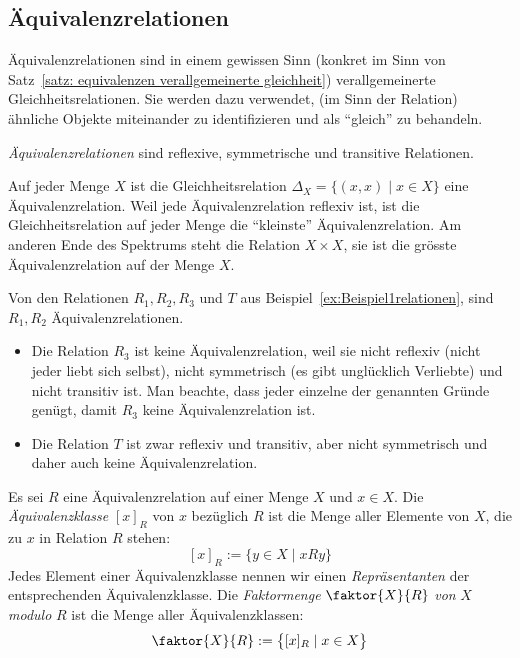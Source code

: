     \subsection*{Äquivalenzrelationen}

    Äquivalenzrelationen sind in einem gewissen Sinn (konkret im Sinn von Satz~\ref{satz: equivalenzen verallgemeinerte gleichheit}) verallgemeinerte Gleichheitsrelationen. Sie werden dazu verwendet, (im Sinn der Relation) ähnliche Objekte miteinander zu identifizieren und als ``gleich'' zu behandeln.

    \begin{df}
    \textit{Äquivalenzrelationen} sind reflexive, symmetrische und transitive Relationen.
    \end{df}

    \begin{bsp}
    Auf jeder Menge $X$ ist die Gleichheitsrelation $\Delta_X=\{(x,x)\mid x\in X \}$ eine Äquivalenzrelation. Weil jede Äquivalenzrelation reflexiv ist, ist die Gleichheitsrelation auf jeder Menge die ``kleinste'' Äquivalenzrelation. Am anderen Ende des Spektrums steht die Relation $X\times X$, sie ist die grösste Äquivalenzrelation auf der Menge $X$.
    \end{bsp}

    \begin{bsp}
    Von den Relationen $R_1,R_2,R_3$ und $T$ aus Beispiel~\ref{ex:Beispiel1relationen}, sind $R_1,R_2$ Äquivalenzrelationen.
    \begin{itemize}
    \item Die Relation $R_3$ ist keine Äquivalenzrelation, weil sie nicht reflexiv (nicht jeder liebt sich selbst), nicht symmetrisch (es gibt unglücklich Verliebte) und nicht transitiv ist. Man beachte, dass jeder einzelne der genannten Gründe genügt, damit $R_3$ keine Äquivalenzrelation ist.
    \item Die Relation $T$ ist zwar reflexiv und transitiv, aber nicht symmetrisch und daher auch keine Äquivalenzrelation.
    \end{itemize}
    \end{bsp}


    \begin{df}
    Es sei $R$ eine Äquivalenzrelation auf einer Menge $X$ und $x\in X$. Die \textit{Äquivalenzklasse} $[x]_R$ von $x$ bezüglich $R$ ist die Menge aller Elemente von $X$, die zu $x$ in Relation $R$ stehen:
    \[
    [x]_R:=\{y\in X\mid xRy \}
    \]
    Jedes Element einer Äquivalenzklasse nennen wir einen \textit{Repräsentanten} der entsprechenden Äquivalenzklasse. Die \textit{Faktormenge} $\faktor{X}{R}$ \textit{von} $X$ \textit{modulo} $R$ ist die Menge aller Äquivalenzklassen:
    \[
    \faktor{X}{R}:=\big\{ [x]_R\mid x\in X \big\}
    \]
    \end{df}

